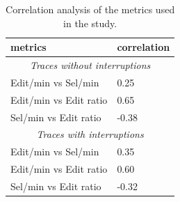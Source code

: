 \documentclass[times]{smrauth}
\newcommand\RR[1]{\textbf{Romain #1}}
\begin{document}
\begin{table}
\small
\renewcommand{\arraystretch}{1.3}
\caption{Correlation analysis of the metrics used in the study.}
\label{tbl:corr_analysis}
\centering
\begin{tabular}{|p{4cm}|p{2cm}|}
	  \hline 
	metrics & correlation \\  
	  \hline 
	\multicolumn{2}{c}{\textit{Traces without interruptions}} \\
	    \hline 
		Edit/min vs Sel/min &  0.25  \\
		Edit/min vs Edit ratio &  0.65\\
		Sel/min vs Edit ratio & -0.38  \\
	    \hline 
	\multicolumn{2}{c}{\textit{Traces with interruptions}} \\
	    \hline 
		Edit/min vs Sel/min &  0.35  \\
		Edit/min vs Edit ratio &  0.60\\
		Sel/min vs Edit ratio & -0.32  \\
	    \hline
\end{tabular}
\end{table}



%		
%
%
%
\end{document}
